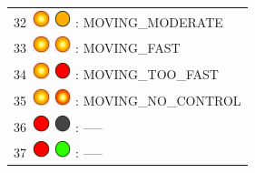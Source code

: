 \documentclass[12pt, a4paper]{report}
\begin{document}
\begin{minipage}{0.45\textwidth}
\begin{Large}
\begin{tabular}{l}
		32\  \includegraphics*[width=5mm]{orange_led_flashing} \includegraphics*[width=5mm]{orange_led} : MOVING\_MODERATE\\
		
		33\  \includegraphics*[width=5mm]{orange_led_flashing} \includegraphics*[width=5mm]{orange_led_flashing} : MOVING\_FAST\\
		
		34\  \includegraphics*[width=5mm]{orange_led_flashing} \includegraphics*[width=5mm]{red_led} : MOVING\_TOO\_FAST\\
		
		35\  \includegraphics*[width=5mm]{orange_led_flashing} \includegraphics*[width=5mm]{red_led_flashing} : MOVING\_NO\_CONTROL\\
		
		36\  \includegraphics*[width=5mm]{red_led} \includegraphics*[width=5mm]{off_led} : -----\\
		
		37\  \includegraphics*[width=5mm]{red_led} \includegraphics*[width=5mm]{green_led} : -----\\
		

\end{tabular}
\end{Large}
\end{minipage}
\end{document}
